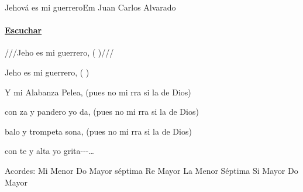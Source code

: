 \documentclass[12pt, spanish]{book}
\begin{document}
    \begin{song}{Jehová es mi guerrero}{Em}
        {} %
        {Juan Carlos Alvarado}
        {} %
        {}
        \ifChordBk
        \paragraph{\mbox{}\hfill\protect\href{https://open.spotify.com/intl-es/track/28ToGBqrF1KTv1rtXROK1T}{Escuchar}\mbox{}\hfill}
        \fi

        \begin{SBChorus}
            ///Jeho es mi guerrero, (    )///

            Jeho es mi guerrero, (    )
        \end{SBChorus}

        \begin{SBOpGroup}
            Y  mi Alabanza Pelea,  (pues no  mi rra si la de Dios)

            con za y pandero yo da,  (pues no  mi rra si la de Dios)

            balo y trompeta sona,  (pues no  mi rra si la de Dios)

            con te y alta  yo grita---\ldots ~~~~
        \end{SBOpGroup}

        \ifChordBk
        \begin{SBOpGroup}
            Acordes:\break
            \upchord{\Em}\qquad Mi Menor \hfill
            \upchord{\Cseven}\qquad Do Mayor s\'eptima \hfill\null\break
            \upchord{\D}\qquad Re Mayor \hfill
            \upchord{\Amseven}\qquad La Menor S\'eptima \hfill\null\break
            \upchord{\B}\qquad Si Mayor \hfill
            \upchord{\C}\qquad Do Mayor \hfill\null\break
        \end{SBOpGroup}
        \fi
    \end{song}
\end{document}
